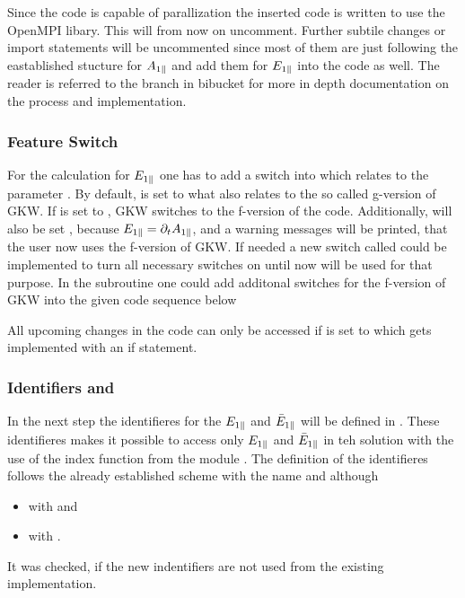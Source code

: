 Since the code is capable of parallization the inserted code is written to use the OpenMPI libary. This will from now on uncomment. Further subtile changes or import statements will be uncommented since most of them are just following the eastablished stucture for $A_{1\parallel}$ and add them for $E_{1\parallel}$ into the code as well. The reader is referred to the branch in bibucket\cite{FeatureEparBitbucket} for more in depth documentation on the process and implementation.

\subsubsection*{Feature Switch}

For the calculation for $E_{1\parallel}$ one has to add a switch into  which relates to the parameter . By default,  is set to  what also relates to the so called g-version of GKW. If  is set to , GKW switches to the f-version of the code. Additionally,  will also be set , because $E_{1\parallel} = \partial_t A_{1\parallel}$, and a warning messages will be printed, that the user now uses the f-version of GKW. If needed a new switch called  could be implemented to turn all necessary switches on until now  will be used for that purpose. In the subroutine  one could add additonal switches for the f-version of GKW into the given code sequence below

All upcoming changes in the code can only be accessed if  is set to  which gets implemented with an if statement.

\subsubsection*{Identifiers  and }

In the next step the identifieres for the $E_{1\parallel}$ and $\bar{E}_{1\parallel}$ will be defined in . These identifieres makes it possible to access only $E_{1\parallel}$ and $\bar{E}_{1\parallel}$ in teh solution  with the use of the index function from the module . The definition of the identifieres follows the already established scheme with the name  and  although 
\begin{itemize}
    \item {} with  and
    \item {} with .
\end{itemize}
It was checked, if the new indentifiers are not used from the existing implementation. \bigskip

